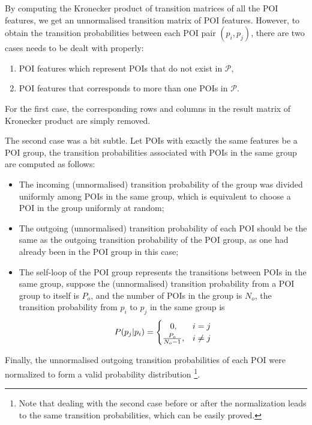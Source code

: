 By computing the Kronecker product of transition matrices of all the POI features,
we get an unnormalised transition matrix of POI features.
However, to obtain the transition probabilities between each POI pair $(p_i, p_j)$,
there are two cases needs to be dealt with properly:
\begin{enumerate}
\item POI features which represent POIs that do not exist in $\mathcal{P}$,
\item POI features that corresponds to more than one POIs in $\mathcal{P}$.
\end{enumerate}

For the first case,
the corresponding rows and columns in the result matrix of Kronecker product are simply removed.

The second case was a bit subtle.
Let POIs with exactly the same features be a POI group,
the transition probabilities associated with POIs in the same group are computed as follows:
\begin{itemize}
\item The incoming (unnormalised) transition probability of the group was divided uniformly among POIs
      in the same group, which is equivalent to choose a POI in the group uniformly at random;
\item The outgoing (unnormalised) transition probability of each POI should be the same as the
      outgoing transition probability of the POI group, as one had already been in the POI group in this case;
\item The self-loop of the POI group represents the transitions between POIs in the same group,
      suppose the (unnormalised) transition probability from a POI group to itself is $P_o$,
      and the number of POIs in the group is $N_o$,
      the transition probability from $p_i$ to $p_j$ in the same group is
      \begin{displaymath}
          P(p_j | p_i) =
          \begin{cases}
              \hfill 0, \hfill & i = j \\
              \hfill \frac{P_o}{N_o - 1}, \hfill & i \ne j \\
          \end{cases}
      \end{displaymath}
\end{itemize}
Finally, the unnormalised outgoing transition probabilities of each POI were normalized to form
a valid probability distribution
\footnote{Note that dealing with the second case before or after the normalization leads to
the same transition probabilities, which can be easily proved. }.
